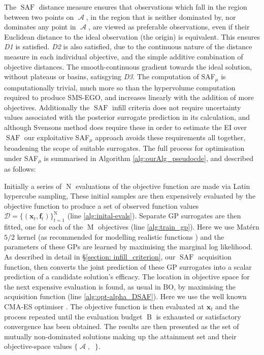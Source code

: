 \documentclass[conference]{IEEEtran}
\DeclareMathOperator*{\evaluatedx}{\bX}
\DeclareMathOperator*{\attainmentfront}{\mathcal{A}}
\DeclareMathOperator*{\attainmentset}{\evaluatedx_{\mathcal{A}}}
\DeclareMathOperator*{\ninitialevaluations}{N}
\DeclareMathOperator*{\nbudget}{B}
\DeclareMathOperator*{\nobj}{M}
\DeclareMathOperator*{\saf}{SAF}
\newcommand\safmu{SAF$_{\mu}$\xspace}
\newcommand\smsego{SMS-EGO\xspace}
\newcommand\ei{EI\xspace}
\newcommand\gp{GP\xspace}
\newcommand\gps{GPs\xspace}
\newcommand{\bx}{\mathbf{x}}
\newcommand{\bX}{\mathbf{X}}
\newcommand{\bff}{\mathbf{f}}
\newcommand{\data}{\mathcal{D}}
\begin{document}
The $\saf$ distance measure ensures that observations which fall in the region between two points on $\attainmentfront$, in the region that is neither dominated by, nor dominates any point in $\attainmentfront$, are viewed as preferable observations, even if their Euclidean distance to the ideal observation (the origin) is equivalent. This ensures \textit{D1} is satisfied. \textit{D2} is also satisfied, due to the continuous nature of the distance measure in each individual objective, and the simple additive combination of objective distances. The smooth-continuous gradient towards the ideal solution, without plateaus or basins, satisgying \textit{D3}. The computation of \safmu is computationally trivial, much more so than the hypervolume computation required to produce \smsego, and increases linearly with the addition of more objectives. Additionally the $\saf$ infill criteria does not require uncertainty values associated with the posterior surrogate prediction in its calculation, and although Svensons \cite{svenson2016multiobjective} method does require these in order to estimate the \ei over $\saf$ our exploitative \safmu approach avoids these requirements all together, broadening the scope of suitable surrogates. The full process for optimisation under \safmu is summarised in Algorithm  \ref{alg:ourAlg_pseudocde}, and described as follows:

Initially a series of $\ninitialevaluations$ evaluations of the objective function are made via  Latin hypercube sampling, These initial samples are then expensively evaluated by the objective function to produce a set of observed function values  $\data = \{(\bx_t, \bff_t)\}_{t=1}^{\ninitialevaluations}$ (line \ref{alg:inital-evals}). Separate \gp surrogates are then fitted, one for each of the $\nobj$ objectives (line \ref{alg:train_gp}). Here we use Mat{\'e}rn $5/2$ kernel (as recommended for modelling realistic functions \cite{snoek:practical}) and the parameters of these \gps are
learned by maximising the marginal log likelihood. As described in detail in \S\ref{section: infill_criterion}, our $\saf$ acquisition function, then converts the joint prediction
of these GP surrogates into a scalar prediction of a candidate solution's
efficacy. The location in objective space for the next expensive
evaluation is found, as usual in BO, by maximising the acquisition function
(line \ref{alg:opt-alpha_DSAF}).  Here we use the well known CMA-ES optimiser
 \cite{hansen2003reducing}. The objective function is then evaluated at
 $\mathbf{x}_t$ and the process repeated until the evaluation budget $\nbudget$ is
 exhausted or satisfactory convergence has been obtained. The results are then presented as the set of mutually non-dominated solutions making up the attainment set and their objective-space values $\{\attainmentfront, \attainmentset\}$.
\end{document}
